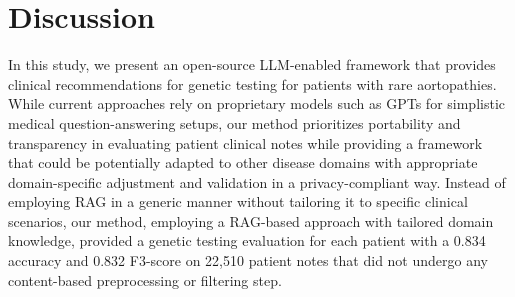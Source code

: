 \documentclass[fleqn,10pt]{wlscirep}
\begin{document}


 

\section*{Discussion}

In this study, we present an open-source LLM-enabled framework that provides clinical recommendations for genetic testing for patients with rare aortopathies. While current approaches rely on proprietary models such as GPTs for simplistic medical question-answering setups,\cite{chimirri2025consistent} our method prioritizes portability and transparency in evaluating patient clinical notes while providing a framework that could be potentially adapted to other disease domains with appropriate domain-specific adjustment and validation in a privacy-compliant way. Instead of employing RAG in a generic manner without tailoring it to specific clinical scenarios,\cite{zelin2024rare} our method, employing a RAG-based approach with tailored domain knowledge, provided a genetic testing evaluation for each patient with a 0.834 accuracy and 0.832 F3-score on 22,510 patient notes that did not undergo any content-based preprocessing or filtering step.
\end{document}

